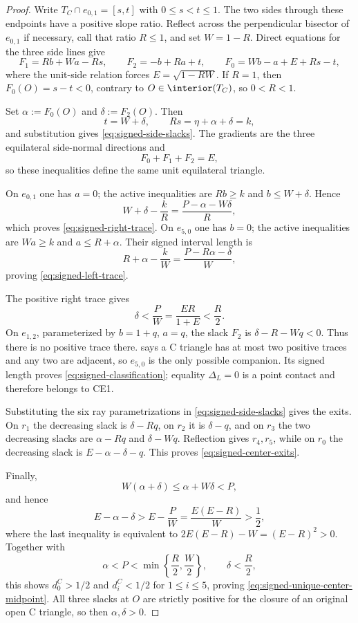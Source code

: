 \begin{proof}
Write $T_C\cap e_{0,1}=[s,t]$ with $0\le s<t\le1$.  The two sides through
these endpoints have a positive slope ratio.  Reflect across the
perpendicular bisector of $e_{0,1}$ if necessary, call that ratio $R\le1$,
and set $W=1-R$.  Direct equations for the three side lines give
\[
 F_1=Rb+Wa-Rs,
 \qquad
 F_2=-b+Ra+t,
 \qquad
 F_0=Wb-a+E+Rs-t,
\]
where the unit-side relation forces $E=\sqrt{1-RW}$.  If $R=1$, then
$F_0(O)=s-t<0$, contrary to $O\in\interior(T_C)$, so $0<R<1$.

Set $\alpha:=F_0(O)$ and $\delta:=F_2(O)$.  Then
\[
 t=W+\delta,
 \qquad
 Rs=\eta+\alpha+\delta=k,
\]
and substitution gives \eqref{eq:signed-side-slacks}.  The gradients are the
three equilateral side-normal directions and
\[
 F_0+F_1+F_2=E,
\]
so these inequalities define the same unit equilateral triangle.

On $e_{0,1}$ one has $a=0$; the active inequalities are
$Rb\ge k$ and $b\le W+\delta$.  Hence
\[
 W+\delta-\frac{k}{R}
 =\frac{P-\alpha-W\delta}{R},
\]
which proves \eqref{eq:signed-right-trace}.  On $e_{5,0}$ one has $b=0$;
the active inequalities are $Wa\ge k$ and $a\le R+\alpha$.  Their signed
interval length is
\[
 R+\alpha-\frac{k}{W}
 =\frac{P-R\alpha-\delta}{W},
\]
proving \eqref{eq:signed-left-trace}.

The positive right trace gives
\[
 \delta<\frac{P}{W}=\frac{ER}{1+E}<\frac R2.
\]
On $e_{1,2}$, parameterized by $b=1+q$, $a=q$, the slack $F_2$ is
$\delta-R-Wq<0$.  Thus there is no positive trace there.
 says a C triangle has at most two positive
traces and any two are adjacent, so $e_{5,0}$ is the only possible companion.
Its signed length proves \eqref{eq:signed-classification}; equality
$\Delta_L=0$ is a point contact and therefore belongs to CE1.

Substituting the six ray parametrizations in
\eqref{eq:signed-side-slacks} gives the exits.  On $r_1$ the decreasing slack
is $\delta-Rq$, on $r_2$ it is $\delta-q$, and on $r_3$ the two decreasing
slacks are $\alpha-Rq$ and $\delta-Wq$.  Reflection gives $r_4,r_5$, while
on $r_0$ the decreasing slack is $E-\alpha-\delta-q$.  This proves
\eqref{eq:signed-center-exits}.

Finally,
\[
 W(\alpha+\delta)\le\alpha+W\delta<P,
\]
and hence
\[
 E-\alpha-\delta
 >E-\frac PW
 =\frac{E(E-R)}W>\frac12,
\]
where the last inequality is equivalent to
$2E(E-R)-W=(E-R)^2>0$.  Together with
\[
 \alpha<P<\min\left\{\frac R2,\frac W2\right\},
 \qquad
 \delta<\frac R2,
\]
this shows $d_0^C>1/2$ and $d_i^C<1/2$ for $1\le i\le5$, proving
\eqref{eq:signed-unique-center-midpoint}.  All three slacks at $O$ are
strictly positive for the closure of an original open C triangle, so then
$\alpha,\delta>0$.
\end{proof}

